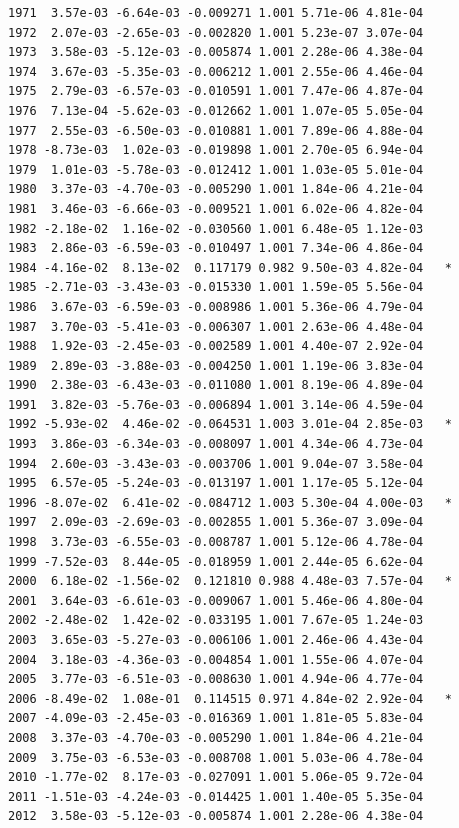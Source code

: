 \documentclass[
  letterpaper,
  DIV=11,
  numbers=noendperiod]{scrartcl}
\begin{document}
\begin{verbatim}
1971  3.57e-03 -6.64e-03 -0.009271 1.001 5.71e-06 4.81e-04    
1972  2.07e-03 -2.65e-03 -0.002820 1.001 5.23e-07 3.07e-04    
1973  3.58e-03 -5.12e-03 -0.005874 1.001 2.28e-06 4.38e-04    
1974  3.67e-03 -5.35e-03 -0.006212 1.001 2.55e-06 4.46e-04    
1975  2.79e-03 -6.57e-03 -0.010591 1.001 7.47e-06 4.87e-04    
1976  7.13e-04 -5.62e-03 -0.012662 1.001 1.07e-05 5.05e-04    
1977  2.55e-03 -6.50e-03 -0.010881 1.001 7.89e-06 4.88e-04    
1978 -8.73e-03  1.02e-03 -0.019898 1.001 2.70e-05 6.94e-04    
1979  1.01e-03 -5.78e-03 -0.012412 1.001 1.03e-05 5.01e-04    
1980  3.37e-03 -4.70e-03 -0.005290 1.001 1.84e-06 4.21e-04    
1981  3.46e-03 -6.66e-03 -0.009521 1.001 6.02e-06 4.82e-04    
1982 -2.18e-02  1.16e-02 -0.030560 1.001 6.48e-05 1.12e-03    
1983  2.86e-03 -6.59e-03 -0.010497 1.001 7.34e-06 4.86e-04    
1984 -4.16e-02  8.13e-02  0.117179 0.982 9.50e-03 4.82e-04   *
1985 -2.71e-03 -3.43e-03 -0.015330 1.001 1.59e-05 5.56e-04    
1986  3.67e-03 -6.59e-03 -0.008986 1.001 5.36e-06 4.79e-04    
1987  3.70e-03 -5.41e-03 -0.006307 1.001 2.63e-06 4.48e-04    
1988  1.92e-03 -2.45e-03 -0.002589 1.001 4.40e-07 2.92e-04    
1989  2.89e-03 -3.88e-03 -0.004250 1.001 1.19e-06 3.83e-04    
1990  2.38e-03 -6.43e-03 -0.011080 1.001 8.19e-06 4.89e-04    
1991  3.82e-03 -5.76e-03 -0.006894 1.001 3.14e-06 4.59e-04    
1992 -5.93e-02  4.46e-02 -0.064531 1.003 3.01e-04 2.85e-03   *
1993  3.86e-03 -6.34e-03 -0.008097 1.001 4.34e-06 4.73e-04    
1994  2.60e-03 -3.43e-03 -0.003706 1.001 9.04e-07 3.58e-04    
1995  6.57e-05 -5.24e-03 -0.013197 1.001 1.17e-05 5.12e-04    
1996 -8.07e-02  6.41e-02 -0.084712 1.003 5.30e-04 4.00e-03   *
1997  2.09e-03 -2.69e-03 -0.002855 1.001 5.36e-07 3.09e-04    
1998  3.73e-03 -6.55e-03 -0.008787 1.001 5.12e-06 4.78e-04    
1999 -7.52e-03  8.44e-05 -0.018959 1.001 2.44e-05 6.62e-04    
2000  6.18e-02 -1.56e-02  0.121810 0.988 4.48e-03 7.57e-04   *
2001  3.64e-03 -6.61e-03 -0.009067 1.001 5.46e-06 4.80e-04    
2002 -2.48e-02  1.42e-02 -0.033195 1.001 7.67e-05 1.24e-03    
2003  3.65e-03 -5.27e-03 -0.006106 1.001 2.46e-06 4.43e-04    
2004  3.18e-03 -4.36e-03 -0.004854 1.001 1.55e-06 4.07e-04    
2005  3.77e-03 -6.51e-03 -0.008630 1.001 4.94e-06 4.77e-04    
2006 -8.49e-02  1.08e-01  0.114515 0.971 4.84e-02 2.92e-04   *
2007 -4.09e-03 -2.45e-03 -0.016369 1.001 1.81e-05 5.83e-04    
2008  3.37e-03 -4.70e-03 -0.005290 1.001 1.84e-06 4.21e-04    
2009  3.75e-03 -6.53e-03 -0.008708 1.001 5.03e-06 4.78e-04    
2010 -1.77e-02  8.17e-03 -0.027091 1.001 5.06e-05 9.72e-04    
2011 -1.51e-03 -4.24e-03 -0.014425 1.001 1.40e-05 5.35e-04    
2012  3.58e-03 -5.12e-03 -0.005874 1.001 2.28e-06 4.38e-04    

\end{verbatim}
\end{document}
